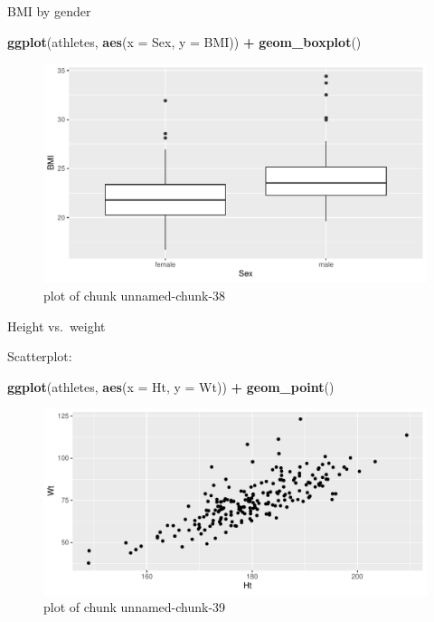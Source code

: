 \documentclass[ignorenonframetext,]{beamer}
\newenvironment{Shaded}{\begin{snugshade}}{\end{snugshade}}
\newcommand{\DataTypeTok}[1]{\textcolor[rgb]{0.13,0.29,0.53}{#1}}
\newcommand{\KeywordTok}[1]{\textcolor[rgb]{0.13,0.29,0.53}{\textbf{#1}}}
\newcommand{\NormalTok}[1]{#1}
\newcommand{\OperatorTok}[1]{\textcolor[rgb]{0.81,0.36,0.00}{\textbf{#1}}}
\newcommand{\StringTok}[1]{\textcolor[rgb]{0.31,0.60,0.02}{#1}}
\begin{document}
\begin{frame}[fragile]{BMI by gender}
\protect\hypertarget{bmi-by-gender}{}

\begin{Shaded}
\begin{Highlighting}[]
\KeywordTok{ggplot}\NormalTok{(athletes, }\KeywordTok{aes}\NormalTok{(}\DataTypeTok{x =}\NormalTok{ Sex, }\DataTypeTok{y =}\NormalTok{ BMI)) }\OperatorTok{+}\StringTok{ }\KeywordTok{geom_boxplot}\NormalTok{()}
\end{Highlighting}
\end{Shaded}

\begin{figure}
\centering
\includegraphics{figure/unnamed-chunk-38-1.pdf}
\caption{plot of chunk unnamed-chunk-38}
\end{figure}

\end{frame}

\begin{frame}[fragile]{Height vs.~weight}
\protect\hypertarget{height-vs.weight}{}

Scatterplot:

\begin{Shaded}
\begin{Highlighting}[]
\KeywordTok{ggplot}\NormalTok{(athletes, }\KeywordTok{aes}\NormalTok{(}\DataTypeTok{x =}\NormalTok{ Ht, }\DataTypeTok{y =}\NormalTok{ Wt)) }\OperatorTok{+}\StringTok{ }\KeywordTok{geom_point}\NormalTok{()}
\end{Highlighting}
\end{Shaded}

\begin{figure}
\centering
\includegraphics{figure/unnamed-chunk-39-1.pdf}
\caption{plot of chunk unnamed-chunk-39}
\end{figure}

\end{frame}
\end{document}
